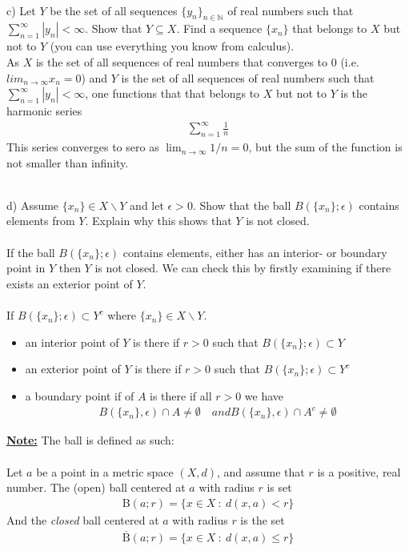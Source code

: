 \documentclass[12pt,letterpaper]{article}
\begin{document}
 \noindent \\
 c)  Let $Y$ be the set of all sequences $ \{y_n\}_{n\in\mathbb{N}}$ of real numbers such that $\sum_{n=1}^{\infty} |y_n| < \infty$. Show that $Y \subseteq X$. Find a sequence $\{x_n\}$ that belongs to $X$ but not to $Y$ (you can use everything you know from calculus).\\
 
 \noindent
As $X$ is the set of all sequences of real numbers that converges to $0$ (i.e. $lim_{n\to \infty} x_n = 0$) and $Y$ is the set of all sequences of real numbers such that $\sum_{n=1}^{\infty} |y_n| < \infty$, one functions that that belongs to $X$ but not to $Y$ is the harmonic series
\begin{align*}
	\sum_{n=1}^\infty \frac{1}{n}
\end{align*} 
This series converges to sero as $\lim_{n \to \infty} 1/n = 0$, but the sum of the function is not smaller than infinity.

 \noindent \\
d) Assume $\{x_n\} \in X \backslash Y$ and let $\epsilon > 0$. Show that the ball $B(\{x_n\}; \epsilon)$ contains elements from $Y$. Explain why this shows that  $Y$ is not closed.\\
 
 \noindent \\
 If the ball $B(\{x_n\}; \epsilon)$ contains elements, either has an interior- or boundary point in $Y$ then $Y$ is not closed. We can check this by firstly examining if there exists an exterior point of $Y$. \\
 \noindent \\
 If $B(\{x_n\}; \epsilon) \subset Y^c$ where $\{x_n\} \in X \backslash Y$.
 
\begin{itemize}
 	\item an interior point of $Y$ is there if $r>0$ such that $B(\{x_n\}; \epsilon) \subset Y$
	\item an exterior point of $Y$ is there if $r>0$ such that $B(\{x_n\}; \epsilon) \subset Y^c$
	\item a boundary point if of $A$ is there if all $r>0$ we have 
	\begin{align*}
		B(\{x_n\}, \epsilon) \cap A \neq \emptyset \quad and B(\{x_n\}, \epsilon) \cap A^c \neq \emptyset
	\end{align*}
\end{itemize}
 
 
 
 \textbf{\uline{Note:}} The ball is defined as such:\\
 \noindent \\ Let $a$ be a point in a metric space $(X,d)$, and assume that $r$ is a positive, real number. The (open) ball centered at $a$ with radius $r$ is set 
 \begin{align*}
 	\text{B}(a;r) = \{x\in X \ : \ d(x,a) <r   \}
 \end{align*}
 And the \emph{closed} ball centered at $a$ with radius $r$ is the set
 \begin{align*}
 	\overline{\text{B}}(a;r) = \{x\in X \ : \ d(x,a) \le r   \}
 \end{align*}
 
\end{document}
